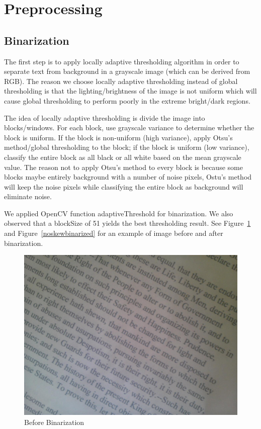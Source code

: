 \documentclass[conference]{IEEEtran}
\begin{document}
\section{Preprocessing}
\subsection{Binarization}

The first step is to apply locally adaptive thresholding algorithm in order to separate text from background in a grayscale image (which can be derived from RGB).  The reason we choose locally adaptive thresholding instead of global thresholding is that the lighting/brightness of the image is not uniform which will cause global thresholding to perform poorly in the extreme bright/dark regions.

The idea of locally adaptive thresholding is divide the image into blocks/windows.  For each block, use grayscale variance to determine whether the block is uniform.  If the block is non-uniform (high variance), apply Otsu's method/global thresholding to the block; if the block is uniform (low variance), classify the entire block as all black or all white based on the mean grayscale value.  The reason not to apply Otsu's method to every block is because some blocks maybe entirely background with a number of noise pixels, Ostu's method will keep the noise pixels while classifying the entire block as background will eliminate noise.

We applied OpenCV function adaptiveThreshold for binarization.  We also observed that a blockSize of 51 yields the best thresholding result.  See Figure~\ref{noskew} and Figure~\ref{noskewbinarized} for an example of image before and after binarization.

\begin{figure}
\center
\includegraphics[scale=0.15]{test261.jpg}
\caption{Before Binarization}
\label{noskew}
\end{figure}
\end{document}
